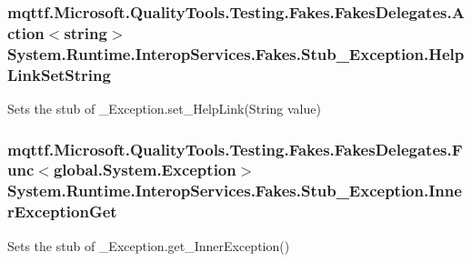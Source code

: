 \hypertarget{class_system_1_1_runtime_1_1_interop_services_1_1_fakes_1_1_stub___exception_aa0feb19b8f799584355bf30be2bc9fd9}{
\subsubsection[{Help\-Link\-Set\-String}]{\setlength{\rightskip}{0pt plus 5cm}mqttf.\-Microsoft.\-Quality\-Tools.\-Testing.\-Fakes.\-Fakes\-Delegates.\-Action$<$string$>$ System.\-Runtime.\-Interop\-Services.\-Fakes.\-Stub\-\_\-\-Exception.\-Help\-Link\-Set\-String}}\label{class_system_1_1_runtime_1_1_interop_services_1_1_fakes_1_1_stub___exception_aa0feb19b8f799584355bf30be2bc9fd9}


Sets the stub of \-\_\-\-Exception.\-set\-\_\-\-Help\-Link(\-String value)

\hypertarget{class_system_1_1_runtime_1_1_interop_services_1_1_fakes_1_1_stub___exception_a09d6b938021be254626a6c08c59cafa5}{
\subsubsection[{Inner\-Exception\-Get}]{\setlength{\rightskip}{0pt plus 5cm}mqttf.\-Microsoft.\-Quality\-Tools.\-Testing.\-Fakes.\-Fakes\-Delegates.\-Func$<$global.\-System.\-Exception$>$ System.\-Runtime.\-Interop\-Services.\-Fakes.\-Stub\-\_\-\-Exception.\-Inner\-Exception\-Get}}\label{class_system_1_1_runtime_1_1_interop_services_1_1_fakes_1_1_stub___exception_a09d6b938021be254626a6c08c59cafa5}


Sets the stub of \-\_\-\-Exception.\-get\-\_\-\-Inner\-Exception()

